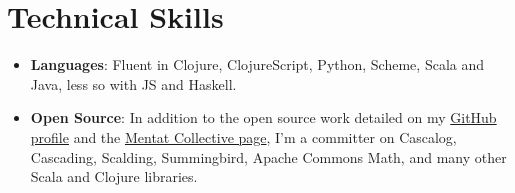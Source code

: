 \documentclass[letterpaper,11pt]{article}
\newcommand{\resumeItem}[2]{\item\small{
    \textbf{#1}{: #2 \vspace{-2pt}}
  }
}
\newcommand{\resumeSubItem}[2]{\resumeItem{#1}{#2}\vspace{-4pt}}
\newcommand{\resumeSubHeadingListStart}{\begin{itemize}[leftmargin=*]}
\newcommand{\resumeSubHeadingListEnd}{\end{itemize}}
\begin{document}
\section{Technical Skills}
\resumeSubHeadingListStart{}
\resumeSubItem{Languages}{
  Fluent in Clojure, ClojureScript, Python, Scheme, Scala and Java, less so with JS and Haskell.}
\resumeSubItem{Open Source}{
  In addition to the open source work detailed on my \href{https://github.com/sritchie}{GitHub profile} and the \href{https://github.com/mentat-collective}{Mentat Collective page}, I'm a committer on Cascalog, Cascading, Scalding, Summingbird, Apache Commons Math, and many other Scala and Clojure libraries.}
\resumeSubHeadingListEnd{}

\end{document}
